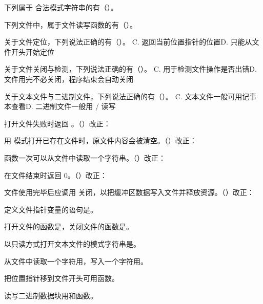 \documentclass[a4paper,11pt]{article}
\begin{document}
\q 下列属于  合法模式字符串的有（\quad）。

\q 下列文件中，属于文件读写函数的有（\quad）。

\q 关于文件定位，下列说法正确的有（\quad）。
{C.  返回当前位置指针的位置}{D.  只能从文件开头开始定位}

\q 关于文件关闭与检测，下列说法正确的有（\quad）。
{C.  用于检测文件操作是否出错}{D. 文件用完不必关闭，程序结束会自动关闭}

\q 关于文本文件与二进制文件，下列说法正确的有（\quad）。
{C. 文本文件一般可用记事本查看}{D. 二进制文件一般用 / 读写}

\q {} 打开文件失败时返回 。\quad（\quad）\quad 改正：\fixblank

\q 用  模式打开已存在文件时，原文件内容会被清空。\quad（\quad）\quad 改正：\fixblank

\q {} 函数一次可以从文件中读取一个字符串。\quad（\quad）\quad 改正：\fixblank

\q {} 在文件结束时返回 0。\quad（\quad）\quad 改正：\fixblank

\q 文件使用完毕后应调用  关闭，以把缓冲区数据写入文件并释放资源。\quad（\quad）\quad 改正：\fixblank

\q 定义文件指针变量的语句是\fillblanks[1.8cm]。

\q 打开文件的函数是\fillblanks[1.2cm]，关闭文件的函数是\fillblanks[1.4cm]。

\q 以只读方式打开文本文件的模式字符串是\fillblanks[1.0cm]。

\q 从文件中读取一个字符用\fillblanks[1.2cm]，写入一个字符用\fillblanks[1.2cm]。

\q 把位置指针移到文件开头可用\fillblanks[1.4cm]函数。

\q 读写二进制数据块用\fillblanks[1.2cm]和\fillblanks[1.4cm]函数。
\end{document}
